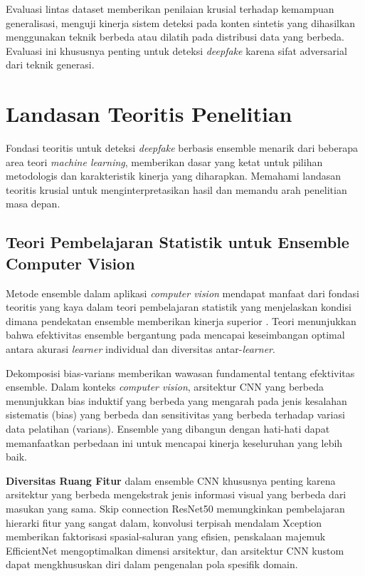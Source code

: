 Evaluasi lintas dataset memberikan penilaian krusial terhadap kemampuan generalisasi, menguji kinerja sistem deteksi pada konten sintetis yang dihasilkan menggunakan teknik berbeda atau dilatih pada distribusi data yang berbeda. Evaluasi ini khususnya penting untuk deteksi \textit{deepfake} karena sifat adversarial dari teknik generasi.

\section{Landasan Teoritis Penelitian}

Fondasi teoritis untuk deteksi \textit{deepfake} berbasis ensemble menarik dari beberapa area teori \textit{machine learning}, memberikan dasar yang ketat untuk pilihan metodologis dan karakteristik kinerja yang diharapkan. Memahami landasan teoritis krusial untuk menginterpretasikan hasil dan memandu arah penelitian masa depan.

\subsection{Teori Pembelajaran Statistik untuk Ensemble Computer Vision}

Metode ensemble dalam aplikasi \textit{computer vision} mendapat manfaat dari fondasi teoritis yang kaya dalam teori pembelajaran statistik yang menjelaskan kondisi dimana pendekatan ensemble memberikan kinerja superior \cite{breiman2001random}. Teori menunjukkan bahwa efektivitas ensemble bergantung pada mencapai keseimbangan optimal antara akurasi \textit{learner} individual dan diversitas antar-\textit{learner}.

Dekomposisi bias-varians memberikan wawasan fundamental tentang efektivitas ensemble. Dalam konteks \textit{computer vision}, arsitektur CNN yang berbeda menunjukkan bias induktif yang berbeda yang mengarah pada jenis kesalahan sistematis (bias) yang berbeda dan sensitivitas yang berbeda terhadap variasi data pelatihan (varians). Ensemble yang dibangun dengan hati-hati dapat memanfaatkan perbedaan ini untuk mencapai kinerja keseluruhan yang lebih baik.

\textbf{Diversitas Ruang Fitur} dalam ensemble CNN khususnya penting karena arsitektur yang berbeda mengekstrak jenis informasi visual yang berbeda dari masukan yang sama. Skip connection ResNet50 memungkinkan pembelajaran hierarki fitur yang sangat dalam, konvolusi terpisah mendalam Xception memberikan faktorisasi spasial-saluran yang efisien, penskalaan majemuk EfficientNet mengoptimalkan dimensi arsitektur, dan arsitektur CNN kustom dapat mengkhususkan diri dalam pengenalan pola spesifik domain.

